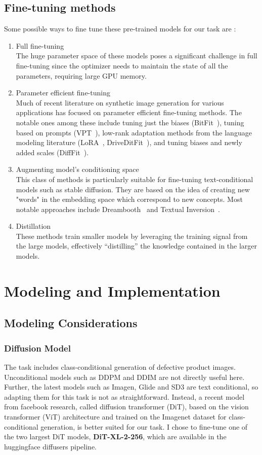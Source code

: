 \documentclass[]{article}
\begin{document}
\subsection{Fine-tuning methods}
Some possible ways to fine tune these pre-trained models for our task are :
\begin{enumerate}
	\item Full fine-tuning\\
	The huge parameter space of these models poses a significant challenge in full fine-tuning since the optimizer needs to maintain the state of all the parameters, requiring large GPU memory.
	\item Parameter efficient fine-tuning\\
	Much of recent literature on synthetic image generation for various applications has focused on parameter efficient fine-tuning methods. The notable ones among these include tuning just the biases (BitFit~\cite{bitfit}), tuning based on prompts (VPT~\cite{vpt}), low-rank adaptation methods from the language modeling literature (LoRA~\cite{lora}, DriveDitFit~\cite{driveditfit}), and tuning biases and newly added scales (DiffFit~\cite{difffit}).
	\item Augmenting model's conditioning space\\
	This class of methods is particularly suitable for fine-tuning text-conditional models such as stable diffusion. They are based on the idea of creating new "words" in the embedding space which correspond to new concepts. Most notable approaches include Dreambooth~\cite{dreambooth} and Textual Inversion~\cite{textualinversion}. 
	\item Distillation\\
	These methods train smaller models by leveraging the training signal from the large models, effectively ``distilling'' the knowledge contained in the larger models. 
\end{enumerate}
\section{Modeling and Implementation}
\subsection{Modeling Considerations}
\subsubsection{Diffusion Model}
The task includes class-conditional generation of defective product images. Unconditional models such as DDPM and DDIM are not directly useful here. Further, the latest models such as Imagen, Glide and SD3 are text conditional, so adapting them for this task is not as straightforward. Instead, a recent model from facebook research, called diffusion transformer (DiT), based on the vision transformer (ViT) architecture and trained on the Imagenet dataset for class-conditional generation, is better suited for our task. I chose to fine-tune one of the two largest DiT models, \textbf{DiT-XL-2-256}, which are available in the huggingface diffusers pipeline.
\end{document}
